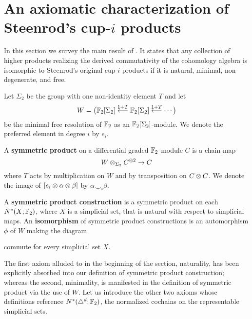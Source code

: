
\section{An axiomatic characterization of Steenrod's cup-$i$ products}

In this section we survey the main result of \cite{medina2018axiomatic}.
It states that any collection of higher products realizing the derived commutativity of the cohomology algebra is isomorphic to Steenrod's original cup-$i$ products if it is natural, minimal, non-degenerate, and free.

Let $\Sigma_2$ be the group with one non-identity element $T$ and let
\begin{equation} \label{equation: definition of W}
W = \big( {\mathbb{F}_2}[\Sigma_2] \stackrel{1+T}{\longleftarrow} {\mathbb{F}_2}[\Sigma_2] \stackrel{1+T}{\longleftarrow} \cdots \big)
\end{equation}
be the minimal free resolution of ${\mathbb{F}_2}$ as an ${\mathbb{F}_2}[\Sigma_2]$-module.
We denote the preferred element in degree $i$ by $e_i$.

A \textbf{symmetric product} on a differential graded ${\mathbb{F}_2}$-module $C$ is a chain map
\begin{equation*}
W \otimes_{\Sigma_2} C^{\otimes 2} \to C
\end{equation*}
where $T$ acts by multiplication on $W$ and by transposition on $C \otimes C$.
We denote the image of $[e_i \otimes \alpha \otimes \beta]$ by $\alpha \smallsmile_i \beta$.

A \textbf{symmetric product construction} is a symmetric product on each $N^*(X; {\mathbb{F}_2})$, where $X$ is a simplicial set, that is natural with respect to simplicial maps.
An \textbf{isomorphism} of symmetric product constructions is an automorphism $\phi$ of $W$ making the diagram
\begin{center}
\end{center}
commute for every simplicial set $X$.

The first axiom alluded to in the beginning of the section, naturality, has been explicitly absorbed into our definition of symmetric product construction; whereas the second, minimality, is manifested in the definition of symmetric product via the use of $W$.
Let us introduce the other two axioms whose definitions reference $N^*(\triangle^d; {\mathbb{F}_2})$, the normalized cochains on the representable simplicial sets.

